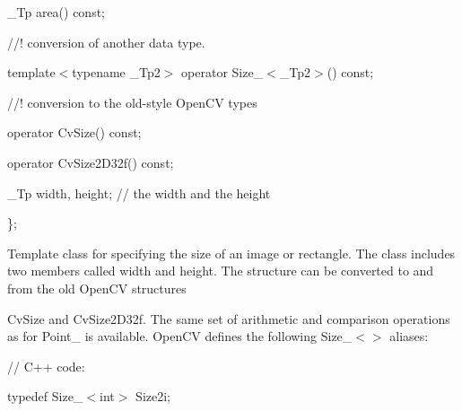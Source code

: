 {\ttfamily }

{\ttfamily }

{\ttfamily \+\_\+\+Tp area() const;}

{\ttfamily }

{\ttfamily }

{\ttfamily //! conversion of another data type.}

{\ttfamily }

{\ttfamily }

{\ttfamily template$<$typename \+\_\+\+Tp2$>$ operator Size\+\_\+$<$\+\_\+\+Tp2$>$() const;}

{\ttfamily }

{\ttfamily }

{\ttfamily //! conversion to the old-\/style Open\+CV types}

{\ttfamily }

{\ttfamily }

{\ttfamily operator Cv\+Size() const;}

{\ttfamily }

{\ttfamily }

{\ttfamily operator Cv\+Size2\+D32f() const;}

{\ttfamily }

{\ttfamily }

{\ttfamily \+\_\+\+Tp width, height; // the width and the height}

{\ttfamily }

{\ttfamily }

{\ttfamily \};}

{\ttfamily }

{\ttfamily }

{\ttfamily Template class for specifying the size of an image or rectangle. The class includes two members called {\ttfamily width} and {\ttfamily height}. The structure can be converted to and from the old Open\+CV structures }

{\ttfamily Cv\+Size} and {\ttfamily Cv\+Size2\+D32f}. The same set of arithmetic and comparison operations as for {\ttfamily Point\+\_\+} is available. Open\+CV defines the following {\ttfamily Size\+\_\+$<$$>$} aliases\+: {\ttfamily }

{\ttfamily }

{\ttfamily }

{\ttfamily // C++ code\+:}

{\ttfamily }

{\ttfamily }

{\ttfamily typedef Size\+\_\+$<$int$>$ Size2i;}

